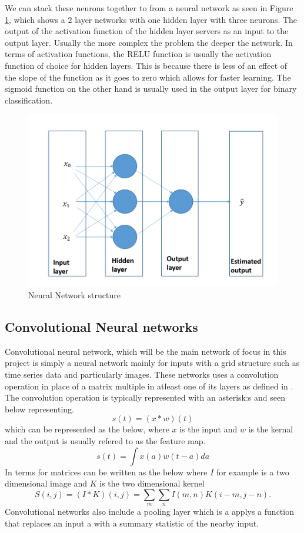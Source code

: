 We can stack these neurons together to from a neural network as seen in Figure \ref{fig:neuralnetwork}, which shows a 2 layer networks with one hidden layer with three neurons. The output of the activation function of the hidden layer servers as an input to the output layer. Usually the more complex the problem the deeper the network.
In terms of activation functions, the RELU function is usually the activation function of choice for hidden layers. This is because there is less of an effect of the slope of the function as it goes to zero which allows for faster learning. The sigmoid function on the other hand is usually used in the output layer for binary classification.

\begin{figure}
  \includegraphics[width=\linewidth, scale=0.2]{multi-layer-network.PNG}
  \caption{Neural Network structure}
  \label{fig:neuralnetwork}
\end{figure}

\subsection{Convolutional Neural networks}
Convolutional neural network, which will be the main network of focus in this project is simply a neural network mainly for inputs with a grid structure such as time series data and particularly images. These networks uses a convolution operation in place of a matrix multiple in atleast one of its layers as defined in \citep{Goodfellow-et-al-2016}. The convolution operation is typically represented with an asterisk:s  and seen below representing. 
\[ s(t) = (x * w)(t) \] 
which can be represented as the below, where $x$ is the input and $w$ is the kernal and the output is usually refered to as the feature map.
\[ s(t) = \int x(a) w(t - a)da \] 
In terms for matrices can be written as the below where $I$ for example is a two dimensional image and $K$ is the two dimensional kernel
\[S(i, j) = (I*K)(i, j) = \sum_m \sum_nI(m, n)K(i- m, j- n). \]
Convolutional networks also include a pooling layer which is a applys a function that replaces an input a with a summary statistic of the nearby input.

